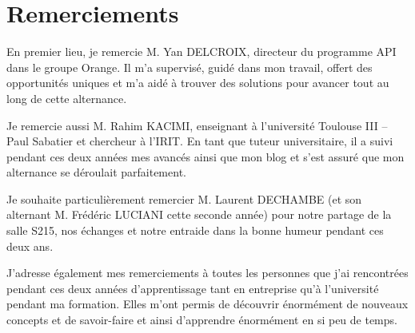 \section*{Remerciements}

En premier lieu, je remercie M. Yan \textsc{DELCROIX}, directeur du programme API dans le groupe Orange.
Il m'a supervisé, guidé dans mon travail, offert des opportunités uniques et m'a aidé à trouver des solutions pour avancer tout au long de cette alternance.

Je remercie aussi M. Rahim \textsc{KACIMI}, enseignant à l'université Toulouse III – Paul Sabatier et chercheur à l’IRIT.
En tant que tuteur universitaire, il a suivi pendant ces deux années mes avancés ainsi que mon blog et s'est assuré que mon alternance se déroulait parfaitement.

Je souhaite particulièrement remercier M. Laurent \textsc{DECHAMBE} (et son alternant M. Frédéric \textsc{LUCIANI} cette seconde année) pour notre partage de la salle S215, nos échanges et notre entraide dans la bonne humeur pendant ces deux ans.

J'adresse également mes remerciements à toutes les personnes que j’ai rencontrées pendant ces deux années d’apprentissage tant en entreprise qu'à l'université pendant ma formation.
Elles m'ont permis de découvrir énormément de nouveaux concepts et de savoir-faire et ainsi d'apprendre énormément en si peu de temps.
